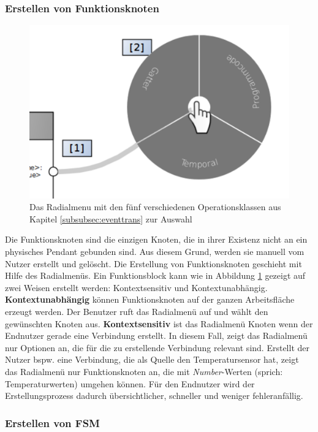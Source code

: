 \subsubsection{Erstellen von Funktionsknoten}

\begin{figure}[h]
  \centering
  \includegraphics[width=.6\textwidth]{bilder/chapter4/chapter4_3/createNodes.pdf}
  \caption{Das Radialmenu mit den fünf verschiedenen Operationsklassen aus Kapitel \ref{subsubsec:eventtrans} zur Auswahl}
  \label{fig:createNodesInteraction}
\end{figure}
Die Funktionsknoten sind die einzigen Knoten, die in ihrer Existenz nicht an ein physisches Pendant gebunden sind. Aus diesem Grund, werden sie manuell vom Nutzer erstellt und gelöscht. Die Erstellung von Funktionsknoten geschieht mit Hilfe des Radialmenüs. Ein Funktionsblock kann wie in Abbildung \ref{fig:createNodesInteraction} gezeigt auf zwei Weisen erstellt werden: Kontextsensitiv und Kontextunabhängig. \textbf{Kontextunabhängig} können Funktionsknoten auf der ganzen Arbeitsfläche erzeugt werden. Der Benutzer ruft das Radialmenü auf und wählt den gewünschten Knoten aus. \textbf{Kontextsensitiv} ist das Radialmenü Knoten wenn der Endnutzer gerade eine Verbindung erstellt. In diesem Fall, zeigt das Radialmenü nur Optionen an, die für die zu erstellende Verbindung relevant sind. Erstellt der Nutzer bspw. eine Verbindung, die als Quelle den Temperatursensor hat, zeigt das Radialmenü nur Funktionsknoten an, die mit \textit{Number}-Werten (sprich: Temperaturwerten) umgehen können. Für den Endnutzer wird der Erstellungsprozess dadurch übersichtlicher, schneller und weniger fehleranfällig.

\subsubsection{Erstellen von \ac{FSM}}\label{FSMkreieren}



